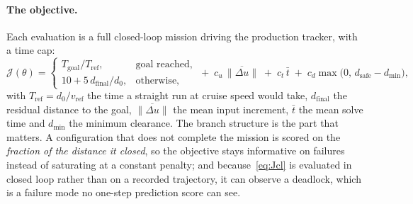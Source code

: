 \documentclass[11pt,a4paper]{article}
\newcommand{\dsafe}{d_{\mathrm{safe}}}
\begin{document}
\paragraph{The objective.} Each evaluation is a full closed-loop mission driving the production tracker, with
a time cap:
\begin{equation}
  \mathcal{J}(\theta)=
  \begin{cases}
    T_{\mathrm{goal}}/T_{\mathrm{ref}}, & \text{goal reached},\\[2pt]
    10+5\,d_{\mathrm{final}}/d_0, & \text{otherwise},
  \end{cases}
  \;+\;c_u\,\overline{\|\Delta u\|}\;+\;c_t\,\bar t\;+\;c_d\max\big(0,\,\dsafe-d_{\min}\big),
  \label{eq:Jcl}
\end{equation}
with $T_{\mathrm{ref}}=d_0/v_{\mathrm{ref}}$ the time a straight run at cruise speed would take,
$d_{\mathrm{final}}$ the residual distance to the goal, $\overline{\|\Delta u\|}$ the mean input increment,
$\bar t$ the mean solve time and $d_{\min}$ the minimum clearance. The branch structure is the part that
matters. A configuration that does not complete the mission is scored on the \emph{fraction of the distance
it closed}, so the objective stays informative on failures instead of saturating at a constant penalty; and
because~\eqref{eq:Jcl} is evaluated in closed loop rather than on a recorded trajectory, it can observe a
deadlock, which is a failure mode no one-step prediction score can see.
\end{document}

